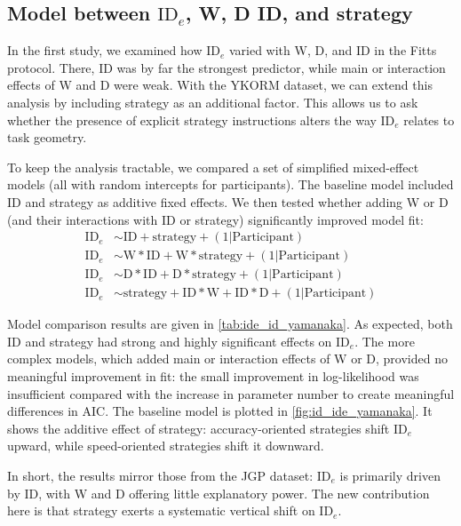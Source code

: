 \documentclass[acmlarge, manuscript,review]{acmart}
\newcommand{\ide}{\ensuremath{{\text{ID}_e}}\xspace}
\newcommand{\D}{\ensuremath{{\text{D}}}\xspace}
\newcommand{\W}{\ensuremath{{\text{W}}}\xspace}
\begin{document}
\subsection{Model between \ide, W, D ID, and strategy}
In the first study, we examined how \ide varied with W, D, and ID in the Fitts protocol. There, ID was by far the strongest predictor, while main or interaction effects of W and D were weak. With the YKORM dataset, we can extend this analysis by including strategy as an additional factor. This allows us to ask whether the presence of explicit strategy instructions alters the way \ide relates to task geometry.


To keep the analysis tractable, we compared a set of simplified mixed-effect models (all with random intercepts for participants). The baseline model included ID and strategy as additive fixed effects. We then tested whether adding W or D (and their interactions with ID or strategy) significantly improved model fit:
\begin{align}
		\ide & \sim  \text{ID} + \text{strategy} + (1|\text{Participant})\label{eq:ide_id_yamanaka_short} \\
		\ide & \sim \W*\text{ID} + \W*\text{strategy} + (1|\text{Participant})\label{eq:ide_id_yamanaka_W}\\
	\ide & \sim \D*\text{ID} + \D*\text{strategy} + (1|\text{Participant})\label{eq:ide_id_yamanaka_D}\\
\ide & \sim \text{strategy} + \text{ID}*\W + \text{ID}*\D + (1|\text{Participant}) \label{eq:ide_id_yamanaka_full} 
\end{align}

Model comparison results are given in \autoref{tab:ide_id_yamanaka}. As expected, both ID and strategy had strong and highly significant effects on \ide. The more complex models, which added main or interaction effects of W or D, provided no meaningful improvement in fit: the small improvement in log-likelihood was insufficient compared with the increase in parameter number to create meaningful differences in AIC.
The baseline model is plotted in \autoref{fig:id_ide_yamanaka}. It shows the additive effect of strategy: accuracy-oriented strategies shift \ide upward, while speed-oriented strategies shift it downward. 

In short, the results mirror those from the JGP dataset: \ide is primarily driven by ID, with W and D offering little explanatory power. The new contribution here is that strategy exerts a systematic vertical shift on \ide.
\end{document}
